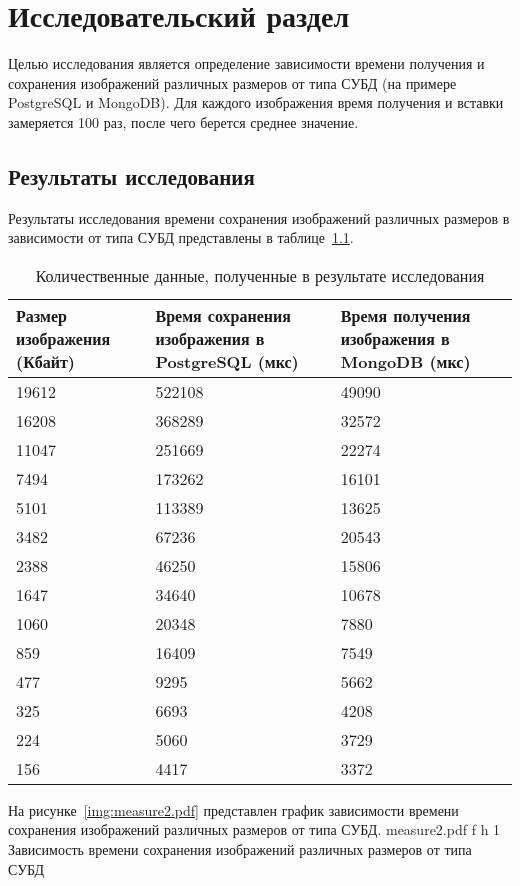 \chapter{Исследовательский раздел}

Целью исследования является определение зависимости времени получения и сохранения изображений различных размеров от типа СУБД (на примере PostgreSQL и MongoDB).
Для каждого изображения время получения и вставки замеряется 100 раз, после чего берется среднее значение.

\section{Результаты исследования}

Результаты исследования времени сохранения изображений различных размеров в зависимости от типа СУБД представлены в таблице~\ref{table:measure2}.
\begin{table}[!ht]
	\centering
	\caption{\label{table:measure2} Количественные данные, полученные в результате исследования}
	\begin{tabularx}{\textwidth}{|X|X|X|}
		\hline
		Размер изображения (Кбайт) & Время сохранения изображения в PostgreSQL (мкс) & Время получения изображения в MongoDB (мкс) \\ \hline
      	19612 & 522108 & 49090 \\ \hline
		16208 & 368289 & 32572 \\ \hline
		11047 & 251669 & 22274 \\ \hline
		7494 & 173262 & 16101 \\ \hline
		5101 & 113389 & 13625 \\ \hline
		3482 & 67236 & 20543 \\ \hline
		2388 & 46250 & 15806 \\ \hline
		1647 & 34640 & 10678 \\ \hline
		1060 & 20348 & 7880 \\ \hline
		859 & 16409 & 7549 \\ \hline
		477 & 9295 & 5662 \\ \hline
		325 & 6693 & 4208 \\ \hline
		224 & 5060 & 3729 \\ \hline
		156 & 4417 & 3372 \\ \hline
	\end{tabularx}
\end{table}

\clearpage
 
На рисунке~\ref{img:measure2.pdf} представлен график зависимости времени сохранения изображений различных размеров от типа СУБД.
	{measure2.pdf}
	{f}
	{h}
	{1\textwidth}
	{Зависимость времени сохранения изображений различных размеров от типа СУБД}
	
